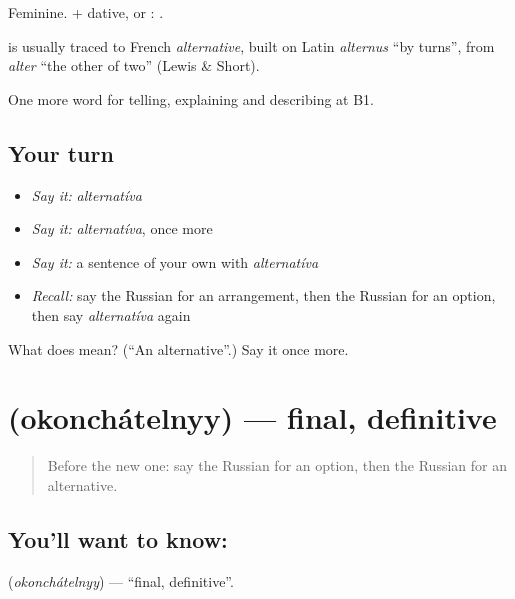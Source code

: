 Feminine. \emph{} + dative, or \emph{}: \emph{ }.

\begin{cousinweb}
\textbf{} is usually traced to French \emph{alternative}, built on Latin \emph{alternus} \textquotedblleft{}by turns\textquotedblright{}, from \emph{alter} \textquotedblleft{}the other of two\textquotedblright{} (Lewis \& Short).
\end{cousinweb}

\begin{grammarlens}[title={What you've built}]
One more word for telling, explaining and describing at B1.
\end{grammarlens}

\subsection*{Your turn}
\begin{itemize}
\raggedright
  \item \emph{Say it:} \emph{alternatíva}
  \item \emph{Say it:} \emph{alternatíva}, once more
  \item \emph{Say it:} a sentence of your own with \emph{alternatíva}
  \item \emph{Recall:} say the Russian for an arrangement, then the Russian for an option, then say \emph{alternatíva} again
\end{itemize}

\begin{tcolorbox}[breakable,colback=teal!4,colframe=teal!35!black,title={Before you move on}]
What does  mean? (\textquotedblleft{}An alternative\textquotedblright{}.) Say it once more.
\end{tcolorbox}
\section[\texorpdfstring{\ru{окончательный} (okonchátelnyy)}{окончательный (okonchátelnyy)}]{ (okonchátelnyy) — final, definitive}

\label{lesson:RU-C378-okonchatelnyy}



\begin{quote}
Before the new one: say the Russian for an option, then the Russian for an alternative.
\end{quote}

\subsection*{You'll want to know: }
\textbf{} (\emph{okonchátelnyy}) — \textquotedblleft{}final, definitive\textquotedblright{}.

